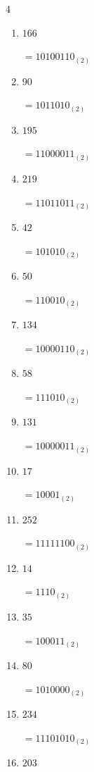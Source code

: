 \begin{multicols}{4}
\begin{enumerate}
        $=1111101_{(2)}$

  \item $166$

        $=10100110_{(2)}$

  \item $90$

        $=1011010_{(2)}$

  \item $195$

        $=11000011_{(2)}$

  \item $219$

        $=11011011_{(2)}$

  \item $42$

        $=101010_{(2)}$

  \item $50$

        $=110010_{(2)}$

\columnbreak %

  \item $134$

        $=10000110_{(2)}$

  \item $58$

        $=111010_{(2)}$

  \item $131$

        $=10000011_{(2)}$

  \item $17$

        $=10001_{(2)}$

  \item $252$

        $=11111100_{(2)}$

  \item $14$

        $=1110_{(2)}$

  \item $35$

        $=100011_{(2)}$

  \item $80$

        $=1010000_{(2)}$

  \item $234$

        $=11101010_{(2)}$

  \item $203$


\end{enumerate}
\end{multicols}
